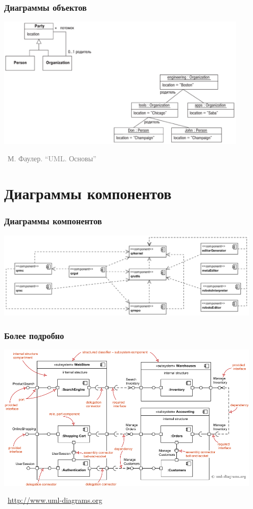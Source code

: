 \documentclass[xetex,mathserif,serif]{beamer}
\newcommand{\attribution}[1] {
    \vspace{-5mm}\begin{flushright}\begin{scriptsize}\textcolor{gray}{\textcopyright\, #1}\end{scriptsize}\end{flushright}
}
\begin{document}
    \begin{frame}
        \frametitle{Диаграммы объектов}
        \begin{center}
            \includegraphics[width=0.9\textwidth]{objectDiagrams.png}
            \attribution{М. Фаулер. ``UML. Основы''}
        \end{center}
    \end{frame}

    \section{Диаграммы компонентов}
    
    \begin{frame}
        \frametitle{Диаграммы компонентов}
        \begin{center}
            \includegraphics[width=0.95\textwidth]{componentDiagrams.png}
        \end{center}
    \end{frame}

    \begin{frame}
        \frametitle{Более подробно}
        \begin{center}
            \includegraphics[width=0.95\textwidth]{componentDiagramsOverview.png}
            \attribution{\url{http://www.uml-diagrams.org}}
        \end{center}
    \end{frame}
\end{document}
